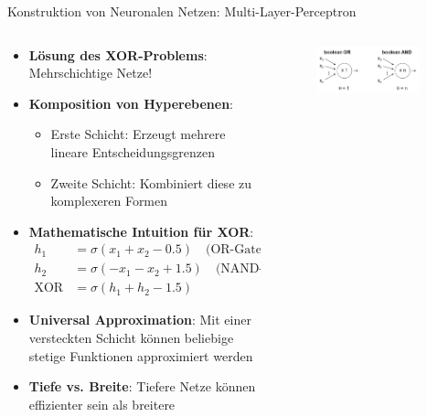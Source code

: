 \documentclass[aspectratio=1610, xcolor=dvipsnames, 9pt]{beamer}
\begin{document}
      \begin{frame}{Konstruktion von Neuronalen Netzen: Multi-Layer-Perceptron}
        \begin{columns}
          \begin{column}{0.7\textwidth}
            \begin{itemize}
              \item \textbf{Lösung des XOR-Problems}: Mehrschichtige Netze!
              \item \textbf{Komposition von Hyperebenen}: 
              \begin{itemize}
                \item Erste Schicht: Erzeugt mehrere lineare Entscheidungsgrenzen
                \item Zweite Schicht: Kombiniert diese zu komplexeren Formen
              \end{itemize}
              \item \textbf{Mathematische Intuition für XOR}:
              \begin{align}
                h_1 &= \sigma(x_1 + x_2 - 0.5) \quad \text{(OR-Gate)} \\
                h_2 &= \sigma(-x_1 - x_2 + 1.5) \quad \text{(NAND-Gate)} \\
                \text{XOR} &= \sigma(h_1 + h_2 - 1.5)
              \end{align}
              \item \textbf{Universal Approximation}: Mit einer versteckten Schicht können beliebige stetige Funktionen approximiert werden
              \item \textbf{Tiefe vs. Breite}: Tiefere Netze können effizienter sein als breitere
            \end{itemize}
          \end{column}
          \begin{column}{0.3\textwidth}
            \begin{figure}
              \centering
                          \includegraphics[width=0.9\textwidth]{images/OR_AND.png}

\end{figure}
\end{column}
\end{columns}
\end{frame}
\end{document}
